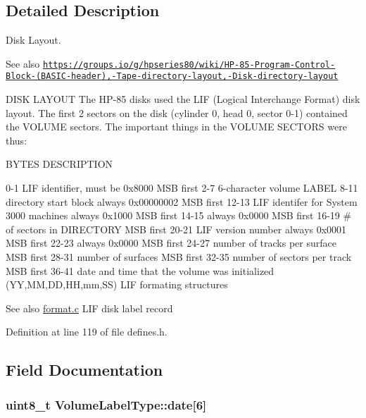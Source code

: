 \subsection{Detailed Description}
Disk Layout. 

\begin{DoxySeeAlso}{See also}
\href{https://groups.io/g/hpseries80/wiki/HP-85-Program-Control-Block-(BASIC-header),-Tape-directory-layout,-Disk-directory-layout}{\tt https\+://groups.\+io/g/hpseries80/wiki/\+H\+P-\/85-\/\+Program-\/\+Control-\/\+Block-\/(\+B\+A\+S\+I\+C-\/header),-\/\+Tape-\/directory-\/layout,-\/\+Disk-\/directory-\/layout}
\end{DoxySeeAlso}
D\+I\+SK L\+A\+Y\+O\+UT The H\+P-\/85 disks used the L\+IF (Logical Interchange Format) disk layout. The first 2 sectors on the disk (cylinder 0, head 0, sector 0-\/1) contained the V\+O\+L\+U\+ME sectors. The important things in the V\+O\+L\+U\+ME S\+E\+C\+T\+O\+RS were thus\+:

B\+Y\+T\+ES D\+E\+S\+C\+R\+I\+P\+T\+I\+ON 

 0-\/1 L\+IF identifier, must be 0x8000 M\+SB first 2-\/7 6-\/character volume L\+A\+B\+EL 8-\/11 directory start block always 0x00000002 M\+SB first 12-\/13 L\+IF identifer for System 3000 machines always 0x1000 M\+SB first 14-\/15 always 0x0000 M\+SB first 16-\/19 \# of sectors in D\+I\+R\+E\+C\+T\+O\+RY M\+SB first 20-\/21 L\+IF version number always 0x0001 M\+SB first 22-\/23 always 0x0000 M\+SB first 24-\/27 number of tracks per surface M\+SB first 28-\/31 number of surfaces M\+SB first 32-\/35 number of sectors per track M\+SB first 36-\/41 date and time that the volume was initialized (YY,MM,DD,HH,mm,SS) L\+IF formating structures \begin{DoxySeeAlso}{See also}
\hyperlink{format_8c}{format.\+c} L\+IF disk label record 
\end{DoxySeeAlso}


Definition at line 119 of file defines.\+h.



\subsection{Field Documentation}
\subsubsection[{\texorpdfstring{date}{date}}]{\setlength{\rightskip}{0pt plus 5cm}uint8\+\_\+t Volume\+Label\+Type\+::date\mbox{[}6\mbox{]}}\hypertarget{structVolumeLabelType_afd5885a37ea57ff74409f8c62a55bd1a}{}\label{structVolumeLabelType_afd5885a37ea57ff74409f8c62a55bd1a}


